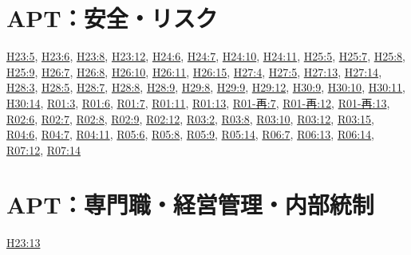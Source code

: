 \section{APT：安全・リスク}
\hyperref[q:h23-reg-apt-05]{H23:5}, \hyperref[q:h23-reg-apt-06]{H23:6}, \hyperref[q:h23-reg-apt-08]{H23:8}, \hyperref[q:h23-reg-apt-12]{H23:12}, \hyperref[q:h24-reg-apt-06]{H24:6}, \hyperref[q:h24-reg-apt-07]{H24:7}, \hyperref[q:h24-reg-apt-10]{H24:10}, \hyperref[q:h24-reg-apt-11]{H24:11}, \hyperref[q:h25-reg-apt-05]{H25:5}, \hyperref[q:h25-reg-apt-07]{H25:7}, \hyperref[q:h25-reg-apt-08]{H25:8}, \hyperref[q:h25-reg-apt-09]{H25:9}, \hyperref[q:h26-reg-apt-07]{H26:7}, \hyperref[q:h26-reg-apt-08]{H26:8}, \hyperref[q:h26-reg-apt-10]{H26:10}, \hyperref[q:h26-reg-apt-11]{H26:11}, \hyperref[q:h26-reg-apt-15]{H26:15}, \hyperref[q:h27-reg-apt-04]{H27:4}, \hyperref[q:h27-reg-apt-05]{H27:5}, \hyperref[q:h27-reg-apt-13]{H27:13}, \hyperref[q:h27-reg-apt-14]{H27:14}, \hyperref[q:h28-reg-apt-03]{H28:3}, \hyperref[q:h28-reg-apt-05]{H28:5}, \hyperref[q:h28-reg-apt-07]{H28:7}, \hyperref[q:h28-reg-apt-08]{H28:8}, \hyperref[q:h28-reg-apt-09]{H28:9}, \hyperref[q:h29-reg-apt-08]{H29:8}, \hyperref[q:h29-reg-apt-09]{H29:9}, \hyperref[q:h29-reg-apt-12]{H29:12}, \hyperref[q:h30-reg-apt-09]{H30:9}, \hyperref[q:h30-reg-apt-10]{H30:10}, \hyperref[q:h30-reg-apt-11]{H30:11}, \hyperref[q:h30-reg-apt-14]{H30:14}, \hyperref[q:r01-reg-apt-03]{R01:3}, \hyperref[q:r01-reg-apt-06]{R01:6}, \hyperref[q:r01-reg-apt-07]{R01:7}, \hyperref[q:r01-reg-apt-11]{R01:11}, \hyperref[q:r01-reg-apt-13]{R01:13}, \hyperref[q:r01-ret-apt-07]{R01-再:7}, \hyperref[q:r01-ret-apt-12]{R01-再:12}, \hyperref[q:r01-ret-apt-13]{R01-再:13}, \hyperref[q:r02-reg-apt-06]{R02:6}, \hyperref[q:r02-reg-apt-07]{R02:7}, \hyperref[q:r02-reg-apt-08]{R02:8}, \hyperref[q:r02-reg-apt-09]{R02:9}, \hyperref[q:r02-reg-apt-12]{R02:12}, \hyperref[q:r03-reg-apt-02]{R03:2}, \hyperref[q:r03-reg-apt-08]{R03:8}, \hyperref[q:r03-reg-apt-10]{R03:10}, \hyperref[q:r03-reg-apt-12]{R03:12}, \hyperref[q:r03-reg-apt-15]{R03:15}, \hyperref[q:r04-reg-apt-06]{R04:6}, \hyperref[q:r04-reg-apt-07]{R04:7}, \hyperref[q:r04-reg-apt-11]{R04:11}, \hyperref[q:r05-reg-apt-06]{R05:6}, \hyperref[q:r05-reg-apt-08]{R05:8}, \hyperref[q:r05-reg-apt-09]{R05:9}, \hyperref[q:r05-reg-apt-14]{R05:14}, \hyperref[q:r06-reg-apt-07]{R06:7}, \hyperref[q:r06-reg-apt-13]{R06:13}, \hyperref[q:r06-reg-apt-14]{R06:14}, \hyperref[q:r07-reg-apt-12]{R07:12}, \hyperref[q:r07-reg-apt-14]{R07:14}
\section{APT：専門職・経営管理・内部統制}
\hyperref[q:h23-reg-apt-13]{H23:13}
